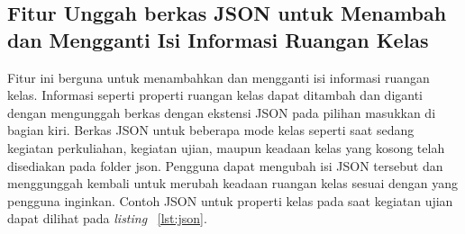 \subsection{Fitur Unggah berkas JSON untuk Menambah dan Mengganti Isi Informasi Ruangan Kelas}
\label{sec:fiturunggahjson}
Fitur ini berguna untuk menambahkan dan mengganti isi informasi ruangan kelas. Informasi seperti properti ruangan kelas dapat ditambah dan diganti dengan mengunggah berkas dengan ekstensi JSON pada pilihan masukkan di bagian kiri. Berkas JSON untuk beberapa mode kelas seperti saat sedang kegiatan perkuliahan, kegiatan ujian, maupun keadaan kelas yang kosong telah disediakan pada folder json. Pengguna dapat mengubah isi JSON tersebut dan menggunggah kembali untuk merubah keadaan ruangan kelas sesuai dengan yang pengguna inginkan. Contoh JSON untuk properti kelas pada saat kegiatan ujian dapat dilihat pada {\it listing} ~\ref{lst:json}.
